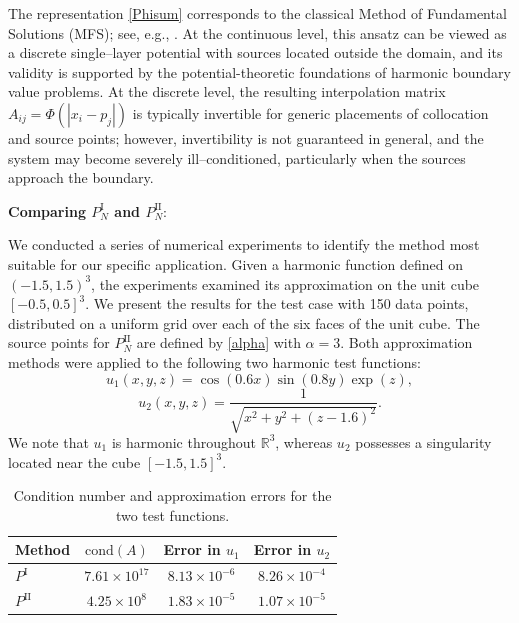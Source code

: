\documentclass[12pt,oneside,reqno]{amsart}%
\theoremstyle{plain}
\numberwithin{equation}{section}
\begin{document}
The representation \eqref{Phisum} corresponds to the classical
Method of Fundamental Solutions (MFS); see, e.g.,
\cite{Fairweather,Barnett}.
At the continuous level, this ansatz can be viewed as a discrete
single--layer potential with sources located outside the domain,
and its validity is supported by the potential-theoretic
foundations of harmonic boundary value problems.
At the discrete level, the resulting interpolation matrix
$A_{ij}=\Phi(|x_i-p_j|)$ is typically invertible for generic
placements of collocation and source points; however,
invertibility is not guaranteed in general, and the system
may become severely ill--conditioned, particularly when the
sources approach the boundary.

\noindent\textbf{Comparing $P_N^\mathrm{I}$ and $P_N^\mathrm{II}$}:

We conducted a series of numerical experiments
to identify the method most suitable for our specific application.
Given a harmonic function defined on $(-1.5,1.5)^3$,
the experiments examined its approximation on the unit cube
$[-0.5,0.5]^3$. We present the results for the test case with 150 data points,
distributed on a uniform grid over each of the six faces of the unit cube. The source points for $P_N^\mathrm{II}$ are defined by \eqref{alpha} with $\alpha=3$.
Both approximation methods were applied to the following two harmonic
test functions:
\[
u_1(x,y,z)=\cos(0.6x)\sin(0.8y)\exp(z),
\]
\[
u_2(x,y,z)=\frac{1}{\sqrt{x^2+y^2+(z-1.6)^2}}.
\]
We note that $u_1$ is harmonic throughout $\mathbb{R}^3$,
whereas $u_2$ possesses a singularity located near the cube
$[-1.5,1.5]^3$.

\medskip
\begin{table}[ht]
\centering

\renewcommand{\arraystretch}{1.4}      %
\setlength{\tabcolsep}{14pt}           %

\begin{tabular}{lccc}
\hline
Method & $\mathrm{cond}(A)$ & Error in $u_1$ & Error in $u_2$ \\
\hline
$P^{\mathrm{I}}$  & $7.61\times 10^{17}$ & $8.13\times 10^{-6}$ & $8.26\times 10^{-4}$ \\
$P^{\mathrm{II}}$ & $4.25 \times 10^{8}$ & $1.83\times 10^{-5}$ & $1.07\times 10^{-5}$ \\
\hline
\end{tabular}

\caption{Condition number and approximation errors for the two test functions.}
\label{tab:comparison}
\end{table}
\end{document}
